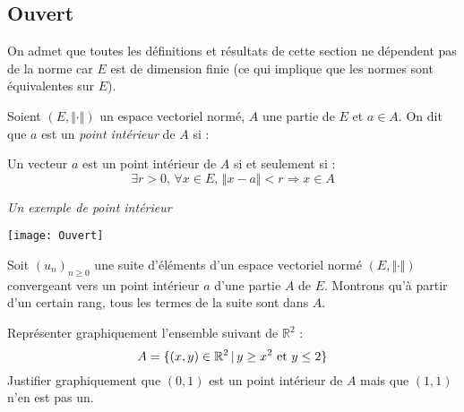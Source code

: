 \documentclass[a4paper,10pt]{report}
\begin{document}
\subsection{Ouvert}

\begin{thm} On admet que toutes les définitions et résultats de cette section ne dépendent pas de la norme car $E$ est de dimension finie (ce qui implique que les normes sont équivalentes sur $E$).
\end{thm}

\begin{defin} Soient $(E, \Vert \cdot \Vert)$ un espace vectoriel normé, $A$ une partie de $E$ et $a \in A$. On dit que $a$ est un \textit{point intérieur} de $A$ si :

\vspace{1cm}
\end{defin}

\begin{rem} Un vecteur $a$ est un point intérieur de $A$ si et seulement si :
$$ \exists r>0, \, \forall x \in E, \, \Vert x-a \Vert < r \Rightarrow x \in A$$
\end{rem}

\begin{center}
\textit{Un exemple de point intérieur}

\texttt{[image: Ouvert]}
\end{center}

\begin{ex} Soit $(u_n)_{n \geq 0}$ une suite d'éléments d'un espace vectoriel normé $(E, \Vert \cdot \Vert)$ convergeant vers un point intérieur $a$ d'une partie $A$ de $E$. Montrons qu'à partir d'un certain rang, tous les termes de la suite sont dans $A$.


\vspace{3cm}
%
\end{ex}

\begin{exa} Représenter graphiquement l'ensemble suivant de $\mathbb{R}^2$ :
$$ A= \lbrace (x,y) \in \mathbb{R}^2 \, \vert \,  y \geq x^2 \hbox{ et } y \leq 2 \rbrace$$
Justifier graphiquement que $(0,1)$ est un point intérieur de $A$ mais que $(1,1)$ n'en est pas un.
\end{exa}
\end{document}
